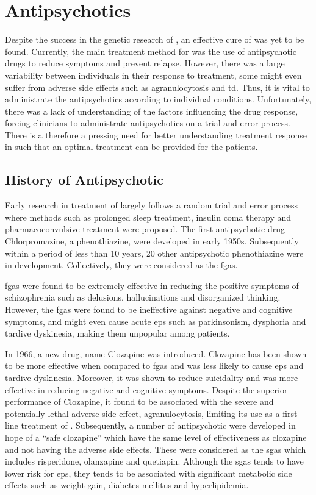 	\section{Antipsychotics}
	Despite the success in the genetic research of , an effective cure of  was yet to be found.
	Currently, the main treatment method for  was the use of antipsychotic drugs to reduce symptoms and prevent relapse. 
	However, there was a large variability between individuals in their response to treatment, some might even suffer from adverse side effects such as agranulocytosis and \gls{td}.
	Thus, it is vital to administrate the antipsychotics according to individual conditions.
	Unfortunately, there was a lack of understanding of the factors influencing the drug response, forcing clinicians to administrate antipsychotics on a trial and error process.
	There is a therefore a pressing need for better understanding treatment response in  such that an optimal treatment can be provided for the patients.
	
	\subsection{History of Antipsychotic}
	Early research in treatment of  largely follows a random trial and error process where methods such as prolonged sleep treatment, insulin coma therapy and pharmacoconvulsive treatment were proposed\citep{Lehmann1997}.
	The first antipsychotic drug Chlorpromazine, a phenothiazine, were developed in early 1950s.
	Subsequently within a period of less than 10 years, 20 other antipsychotic phenothiazine were in development.
	Collectively, they were considered as the \glspl{fga}.
	
	\glspl{fga} were found to be extremely effective in reducing the positive symptoms of schizophrenia such as delusions, hallucinations and disorganized thinking.
	However, the \glspl{fga} were found to be ineffective against negative and cognitive symptoms, and might even cause acute \gls{eps} such as parkinsonism, dysphoria and tardive dyskinesia, making them unpopular among patients\citep{Tandon2007}.
	
	In 1966, a new drug, name Clozapine was introduced\citep{Lehmann1997}. 
	Clozapine has been shown to be more effective when compared to \glspl{fga} and was less likely to cause \gls{eps} and tardive dyskinesia.
	Moreover, it was shown to reduce suicidality and was more effective in reducing negative and cognitive symptoms\citep{Lehmann1997,Tandon2007}.
	Despite the superior performance of Clozapine, it found to be associated with the severe and potentially lethal adverse side effect, agranulocytosis\citep{Alvir1993}, limiting its use as a first line treatment of \citep{Remington2013}.
	Subsequently, a number of antipsychotic were developed in hope of a ``safe clozapine'' which have the same level of effectiveness as clozapine and not having the adverse side effects.
	These were considered as the \glspl{sga} which includes risperidone, olanzapine and quetiapin.
	Although the \glspl{sga} tends to have lower risk for \gls{eps}, they tends to be associated with significant metabolic side effects such as weight gain, diabetes mellitus and hyperlipidemia\citep{UCOK2008}.
	
